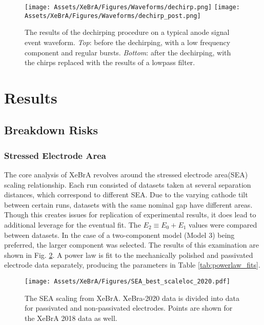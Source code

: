\begin{figure}
    \centering
    \texttt{[image: Assets/XeBrA/Figures/Waveforms/dechirp.png]}\linebreak
    \texttt{[image: Assets/XeBrA/Figures/Waveforms/dechirp\_post.png]}
    \caption[The results of the dechirping procedure on a typical anode signal event waveform.]%
    {The results of the dechirping procedure on a typical anode signal event waveform.
    \textit{Top}: before the dechirping, with a low frequency component and regular bursts.
    \textit{Bottom}: after the dechirping, with the chirps replaced with the results of a lowpass filter.}
    \label{fig:dechirp}
\end{figure}


\afterpage{\FloatBarrier}
\section{Results}
\subsection{Breakdown Risks}
\subsubsection{Stressed Electrode Area}

The core analysis of XeBrA revolves around the stressed electrode area(SEA) scaling relationship.
Each run consisted of datasets taken at several separation distances, which correspond to different SEA.
Due to the varying cathode tilt between certain runs, datasets with the same nominal gap have different areas.
Though this creates issues for replication of experimental results, it does lead to additional leverage for the eventual fit.
The $E_2\equiv E_0+E_1$ values were compared between datasets.
In the case of a two-component model (Model 3) being preferred, the larger component was selected.
The results of this examination are shown in Fig. \ref{fig:sea_scaling}.
A power law is fit to the mechanically polished and passivated electrode data separately, producing the parameters in Table \ref{tab:powerlaw_fits}.

\begin{figure} 
    \centering
    \texttt{[image: Assets/XeBrA/Figures/SEA\_best\_scaleloc\_2020.pdf]}
    \caption[The stressed electrode area scaling relationship inferred from XeBrA.]%
    {The SEA scaling from XeBrA.
    XeBra-2020 data is divided into data for passivated and non-passivated electrodes.
    Points are shown for the XeBrA 2018 data as well.}
    \label{fig:sea_scaling}
\end{figure}


